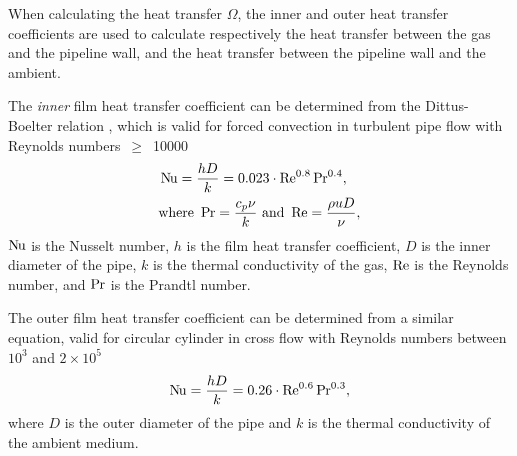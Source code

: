 When calculating the heat transfer $\Omega$, the inner and outer heat transfer coefficients are used to calculate respectively the heat transfer between the gas and the pipeline wall, and the heat transfer between the pipeline wall and the ambient. 

The \emph{inner} film heat transfer coefficient can be determined from the Dittus-Boelter relation \cite{Winterton1998Where,Dittus1985Heat}, which is valid for forced convection in turbulent pipe flow with Reynolds numbers~$\geq$~10000 \cite{Bergman2011Fundamentals}
\begin{align}
    &\operatorname{N\kern-.09em u} = \frac{hD}{k} = 0.023\cdot\operatorname{R\kern-.04em e}^{0.8}\operatorname{P\kern-.03em r}^{0.4},
    \\
    &\mathrm{where~} \operatorname{P\kern-.03em r} = \frac{c_p\nu}{k} \mathrm{~and~} \operatorname{R\kern-.04em e} = \frac{\rho u D}{\nu},
\end{align}
$\operatorname{N\kern-.09em u}$ is the Nusselt number, $h$ is the film heat transfer coefficient, $D$ is the inner diameter of the pipe, $k$ is the thermal conductivity of the gas, $\operatorname{R\kern-.04em e}$ is the Reynolds number, and $\operatorname{P\kern-.03em r}$ is the Prandtl number. 

The outer film heat transfer coefficient can be determined from a similar equation, valid for circular cylinder in cross flow with Reynolds numbers between $10^3$ and $2\times 10^5$ \cite{Bergman2011Fundamentals}
\begin{align}
    \operatorname{N\kern-.09em u} = \frac{hD}{k} = 0.26\cdot\operatorname{R\kern-.04em e}^{0.6}\operatorname{P\kern-.03em r}^{0.3}
,
\end{align}
where $D$ is the outer diameter of the pipe and $k$ is the thermal conductivity of the ambient medium.

